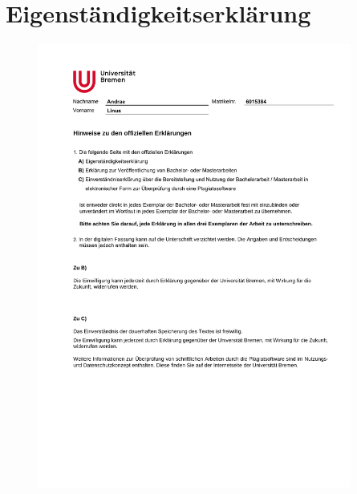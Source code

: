 \documentclass[12pt,a4paper, english,twoside]{scrartcl}
\begin{document}
\section*{Eigenständigkeitserklärung}\label{sec:eigenstaendigkeit}
\begin{figure}[!b]
    \includegraphics[width=0.92\textwidth,page=1]{res/eigenstaendigkeitserklaerung_flat.pdf}
\end{figure}
\newpage
\end{document}
